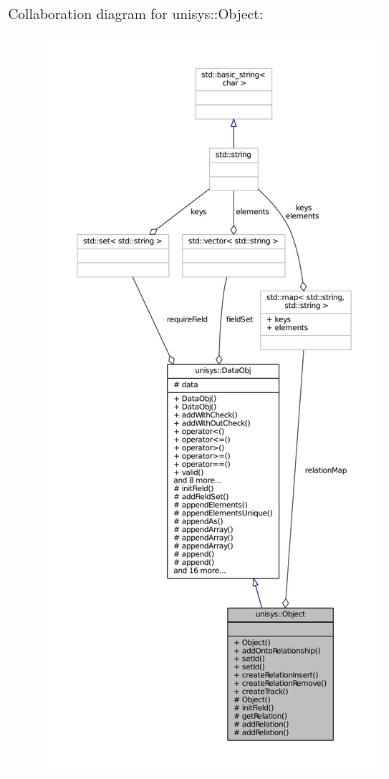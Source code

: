 Collaboration diagram for unisys\-:\-:Object\-:
\nopagebreak
\begin{figure}[H]
\begin{center}
\leavevmode
\includegraphics[height=550pt]{classunisys_1_1Object__coll__graph}
\end{center}
\end{figure}
